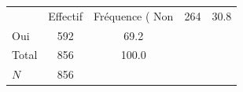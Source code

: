 {
\def\sym#1{\ifmmode^{#1}\else\(^{#1}\)\fi}
\begin{tabular}{l*{1}{cc}}
\toprule
            &    Effectif&Fréquence (%
\midrule
Non         &         264&        30.8\\
Oui         &         592&        69.2\\
Total       &         856&       100.0\\
\midrule
\(N\)       &         856&            \\
\bottomrule
\end{tabular}
}
